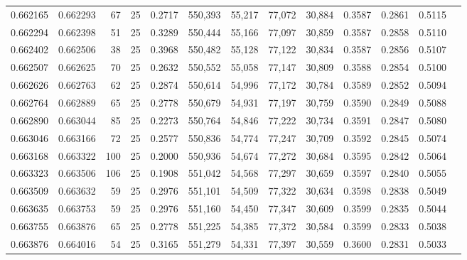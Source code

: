 \begin{tabular}{rrrrrrrrrrrrr}
0.662165 & 0.662293 &    67 &  25 &                                     0.2717 & 550,393 &  55,217 &  77,072 &  30,884 & 0.3587 & 0.2861 & 0.5115 \\
0.662294 & 0.662398 &    51 &  25 &                                     0.3289 & 550,444 &  55,166 &  77,097 &  30,859 & 0.3587 & 0.2858 & 0.5110 \\
0.662402 & 0.662506 &    38 &  25 &                                     0.3968 & 550,482 &  55,128 &  77,122 &  30,834 & 0.3587 & 0.2856 & 0.5107 \\
0.662507 & 0.662625 &    70 &  25 &                                     0.2632 & 550,552 &  55,058 &  77,147 &  30,809 & 0.3588 & 0.2854 & 0.5100 \\
0.662626 & 0.662763 &    62 &  25 &                                     0.2874 & 550,614 &  54,996 &  77,172 &  30,784 & 0.3589 & 0.2852 & 0.5094 \\
0.662764 & 0.662889 &    65 &  25 &                                     0.2778 & 550,679 &  54,931 &  77,197 &  30,759 & 0.3590 & 0.2849 & 0.5088 \\
0.662890 & 0.663044 &    85 &  25 &                                     0.2273 & 550,764 &  54,846 &  77,222 &  30,734 & 0.3591 & 0.2847 & 0.5080 \\
0.663046 & 0.663166 &    72 &  25 &                                     0.2577 & 550,836 &  54,774 &  77,247 &  30,709 & 0.3592 & 0.2845 & 0.5074 \\
0.663168 & 0.663322 &   100 &  25 &                                     0.2000 & 550,936 &  54,674 &  77,272 &  30,684 & 0.3595 & 0.2842 & 0.5064 \\
0.663323 & 0.663506 &   106 &  25 &                                     0.1908 & 551,042 &  54,568 &  77,297 &  30,659 & 0.3597 & 0.2840 & 0.5055 \\
0.663509 & 0.663632 &    59 &  25 &                                     0.2976 & 551,101 &  54,509 &  77,322 &  30,634 & 0.3598 & 0.2838 & 0.5049 \\
0.663635 & 0.663753 &    59 &  25 &                                     0.2976 & 551,160 &  54,450 &  77,347 &  30,609 & 0.3599 & 0.2835 & 0.5044 \\
0.663755 & 0.663876 &    65 &  25 &                                     0.2778 & 551,225 &  54,385 &  77,372 &  30,584 & 0.3599 & 0.2833 & 0.5038 \\
0.663876 & 0.664016 &    54 &  25 &                                     0.3165 & 551,279 &  54,331 &  77,397 &  30,559 & 0.3600 & 0.2831 & 0.5033 \\

\end{tabular}
